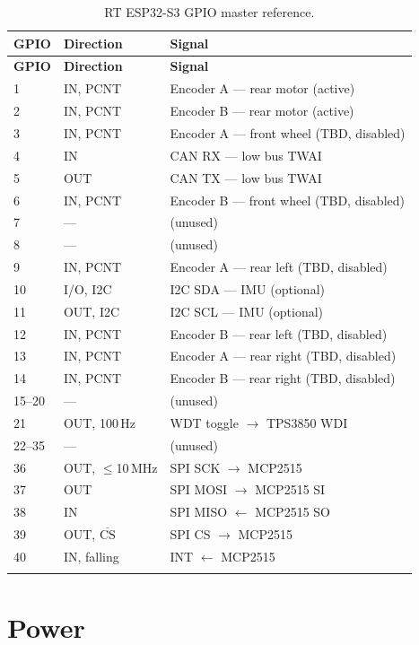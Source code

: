 \documentclass[12pt,a4paper,oneside]{report}
\begin{document}
\begin{center}
\begin{longtable}{lll}
\toprule
\textbf{GPIO} & \textbf{Direction} & \textbf{Signal} \\
\midrule
\endfirsthead
\toprule
\textbf{GPIO} & \textbf{Direction} & \textbf{Signal} \\
\midrule
\endhead
1  & IN, PCNT  & Encoder A --- rear motor (active) \\
2  & IN, PCNT  & Encoder B --- rear motor (active) \\
3  & IN, PCNT  & Encoder A --- front wheel (TBD, disabled) \\
4  & IN        & CAN RX --- low bus TWAI \\
5  & OUT       & CAN TX --- low bus TWAI \\
6  & IN, PCNT  & Encoder B --- front wheel (TBD, disabled) \\
7  & ---       & (unused) \\
8  & ---       & (unused) \\
9  & IN, PCNT  & Encoder A --- rear left (TBD, disabled) \\
10 & I/O, I2C  & I2C SDA --- IMU (optional) \\
11 & OUT, I2C  & I2C SCL --- IMU (optional) \\
12 & IN, PCNT  & Encoder B --- rear left (TBD, disabled) \\
13 & IN, PCNT  & Encoder A --- rear right (TBD, disabled) \\
14 & IN, PCNT  & Encoder B --- rear right (TBD, disabled) \\
15--20 & --- & (unused) \\
21 & OUT, 100\,Hz & WDT toggle $\rightarrow$ TPS3850 WDI \\
22--35 & --- & (unused) \\
36 & OUT, $\leq$10\,MHz & SPI SCK $\rightarrow$ MCP2515 \\
37 & OUT       & SPI MOSI $\rightarrow$ MCP2515 SI \\
38 & IN        & SPI MISO $\leftarrow$ MCP2515 SO \\
39 & OUT, $\overline{\text{CS}}$ & SPI CS $\rightarrow$ MCP2515 \\
40 & IN, falling & INT $\leftarrow$ MCP2515 \\
\bottomrule
\caption{RT ESP32-S3 GPIO master reference.}
\end{longtable}
\end{center}

\section{Power}
\end{document}

